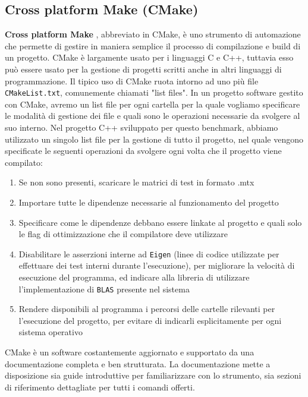 \subsection{Cross platform Make (CMake)}
\textbf{Cross platform Make} \cite{cmake-docs}, abbreviato in CMake, è uno strumento di automazione che permette di gestire in maniera semplice il processo di compilazione
e build di un progetto. CMake è largamente usato per i linguaggi C e C++, tuttavia esso può essere usato per la gestione di progetti scritti anche in altri linguaggi di programmazione.
Il tipico uso di CMake ruota intorno ad uno più file \texttt{CMakeList.txt}, comunemente chiamati "list files". In un progetto software gestito con CMake, avremo un list file per ogni
cartella per la quale vogliamo specificare le modalità di gestione dei file e quali sono le operazioni necessarie da svolgere al suo interno.
Nel progetto C++ sviluppato per questo benchmark, abbiamo utilizzato un singolo list file per la gestione di tutto il progetto, nel quale vengono specificate
le seguenti operazioni da svolgere ogni volta che il progetto viene compilato:
\begin{enumerate}
	\item Se non sono presenti, scaricare le matrici di test in formato .mtx
	\item Importare tutte le dipendenze necessarie al funzionamento del progetto
	\item Specificare come le dipendenze debbano essere linkate al progetto e quali solo le flag di ottimizzazione che il compilatore deve utilizzare
	\item Disabilitare le asserzioni interne ad \texttt{Eigen} (linee di codice utilizzate per effettuare dei test interni durante l'esecuzione), per migliorare la velocità di esecuzione del programma, ed indicare alla libreria di utilizzare l'implementazione di \texttt{BLAS} presente nel sistema
	\item Rendere disponibili al programma i percorsi delle cartelle rilevanti per l'esecuzione del progetto, per evitare di indicarli esplicitamente per ogni sistema operativo
\end{enumerate} 
CMake è un software costantemente aggiornato e supportato da una documentazione completa e ben strutturata. 
La documentazione mette a disposizione sia guide introduttive per familiarizzare con lo strumento, 
sia sezioni di riferimento dettagliate per tutti i comandi offerti.
